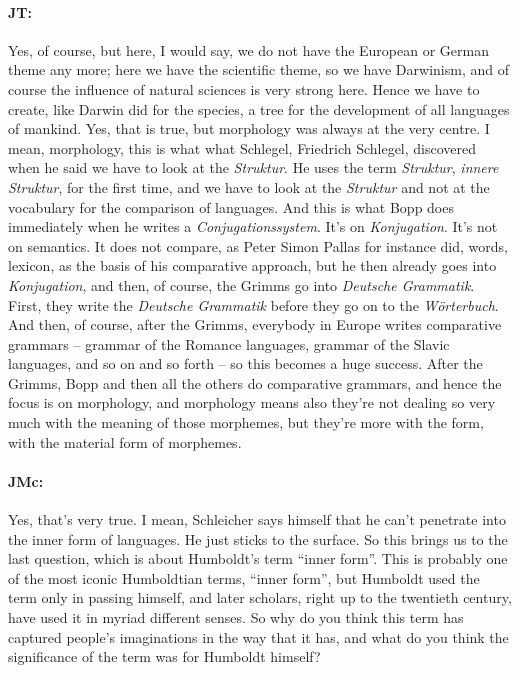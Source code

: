 \documentclass[output=paper]{langscibook}
\begin{document}
\paragraph*{JT:} Yes, of course, but here, I would say, we do not have the European or German theme any more; here we have the scientific theme, so we have Darwinism, and of course the influence of natural sciences is very strong here. Hence we have to create, like Darwin did for the species, a tree for the development of all languages of mankind. Yes, that is true, but morphology was always at the very centre. I mean, morphology, this is what what Schlegel, Friedrich Schlegel, discovered when he said we have to look at the \textit{Struktur}. He uses the term \textit{Struktur}, \textit{innere Struktur}, for the first time, and we have to look at the \textit{Struktur} and not at the vocabulary for the comparison of languages. And this is what Bopp does immediately when he writes a \textit{Conjugationssystem}. It’s on \textit{Konjugation}. It’s not on semantics. It does not compare, as Peter Simon Pallas for instance did, words, lexicon, as the basis of his comparative approach, but he then already goes into \textit{Konjugation}, and then, of course, the Grimms go into \textit{Deutsche Grammatik}. First, they write the \textit{Deutsche Grammatik} before they go on to the \textit{Wörterbuch}. And then, of course, after the Grimms, everybody in Europe writes comparative grammars – grammar of the Romance languages, grammar of the Slavic languages, and so on and so forth – so this becomes a huge success. After the Grimms, Bopp and then all the others do comparative grammars, and hence the focus is on morphology, and morphology means also they’re not dealing so very much with the meaning of those morphemes, but they’re more with the form, with the material form of morphemes.


\paragraph*{JMc:} Yes, that’s very true. I mean, Schleicher says himself that he can’t penetrate into the inner form of languages. He just sticks to the surface. So this brings us to the last question, which is about Humboldt’s term “inner form”. This is probably one of the most iconic Humboldtian terms, “inner form”, but Humboldt used the term only in passing himself, and later scholars, right up to the twentieth century, have used it in myriad different senses. So why do you think this term has captured people’s imaginations in the way that it has, and what do you think the significance of the term was for Humboldt himself?
\end{document}
